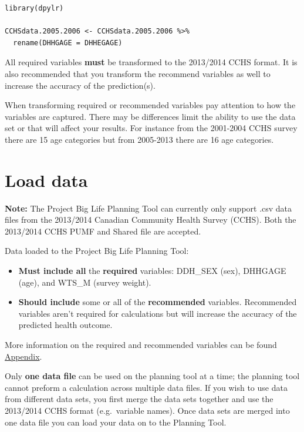 \documentclass[]{book}
\begin{document}
\begin{verbatim}
library(dpylr)

CCHSdata.2005.2006 <- CCHSdata.2005.2006 %>% 
  rename(DHHGAGE = DHHEGAGE)
\end{verbatim}

All required variables \textbf{must} be transformed to the 2013/2014 CCHS format. It is also recommended that you transform the recommend variables as well to increase the accuracy of the prediction(s).

When transforming required or recommended variables pay attention to how the variables are captured. There may be differences limit the ability to use the data set or that will affect your results. For instance from the 2001-2004 CCHS survey there are 15 age categories but from 2005-2013 there are 16 age categories.

\hypertarget{load-data}{%
\section{Load data}\label{load-data}}

\textbf{Note:} The Project Big Life Planning Tool can currently only support .csv data files from the 2013/2014 Canadian Community Health Survey (CCHS). Both the 2013/2014 CCHS PUMF and Shared file are accepted.

Data loaded to the Project Big Life Planning Tool:

\begin{itemize}
\item
  \textbf{Must include all} the \textbf{required} variables: DDH\_SEX (sex), DHHGAGE (age), and WTS\_M (survey weight).
\item
  \textbf{Should include} some or all of the \textbf{recommended} variables. Recommended variables aren't required for calculations but will increase the accuracy of the predicted health outcome.
\end{itemize}

More information on the required and recommended variables can be found \protect\hyperlink{mport}{Appendix}.

Only \textbf{one data file} can be used on the planning tool at a time; the planning tool cannot preform a calculation across multiple data files. If you wish to use data from different data sets, you first merge the data sets together and use the 2013/2014 CCHS format (e.g.~variable names). Once data sets are merged into one data file you can load your data on to the Planning Tool.
\end{document}
